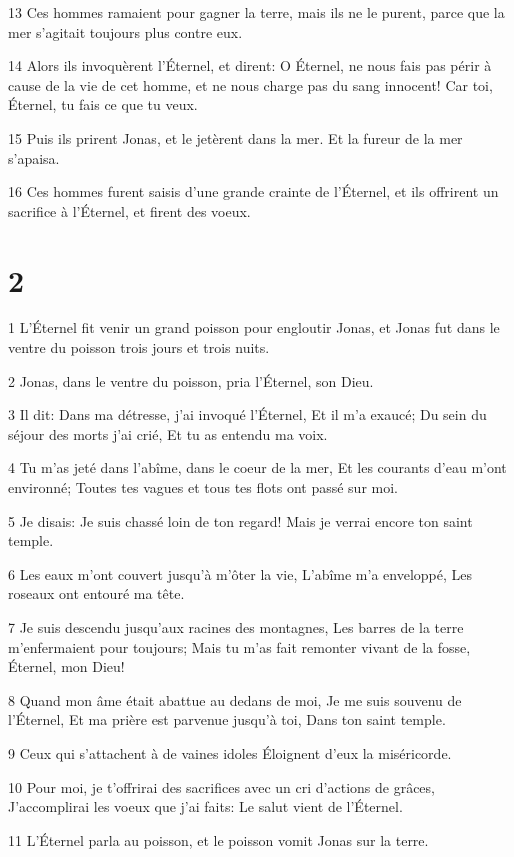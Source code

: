 \par 13 Ces hommes ramaient pour gagner la terre, mais ils ne le purent, parce que la mer s'agitait toujours plus contre eux.
\par 14 Alors ils invoquèrent l'Éternel, et dirent: O Éternel, ne nous fais pas périr à cause de la vie de cet homme, et ne nous charge pas du sang innocent! Car toi, Éternel, tu fais ce que tu veux.
\par 15 Puis ils prirent Jonas, et le jetèrent dans la mer. Et la fureur de la mer s'apaisa.
\par 16 Ces hommes furent saisis d'une grande crainte de l'Éternel, et ils offrirent un sacrifice à l'Éternel, et firent des voeux.

\chapter{2}

\par 1 L'Éternel fit venir un grand poisson pour engloutir Jonas, et Jonas fut dans le ventre du poisson trois jours et trois nuits.
\par 2 Jonas, dans le ventre du poisson, pria l'Éternel, son Dieu.
\par 3 Il dit: Dans ma détresse, j'ai invoqué l'Éternel, Et il m'a exaucé; Du sein du séjour des morts j'ai crié, Et tu as entendu ma voix.
\par 4 Tu m'as jeté dans l'abîme, dans le coeur de la mer, Et les courants d'eau m'ont environné; Toutes tes vagues et tous tes flots ont passé sur moi.
\par 5 Je disais: Je suis chassé loin de ton regard! Mais je verrai encore ton saint temple.
\par 6 Les eaux m'ont couvert jusqu'à m'ôter la vie, L'abîme m'a enveloppé, Les roseaux ont entouré ma tête.
\par 7 Je suis descendu jusqu'aux racines des montagnes, Les barres de la terre m'enfermaient pour toujours; Mais tu m'as fait remonter vivant de la fosse, Éternel, mon Dieu!
\par 8 Quand mon âme était abattue au dedans de moi, Je me suis souvenu de l'Éternel, Et ma prière est parvenue jusqu'à toi, Dans ton saint temple.
\par 9 Ceux qui s'attachent à de vaines idoles Éloignent d'eux la miséricorde.
\par 10 Pour moi, je t'offrirai des sacrifices avec un cri d'actions de grâces, J'accomplirai les voeux que j'ai faits: Le salut vient de l'Éternel.
\par 11 L'Éternel parla au poisson, et le poisson vomit Jonas sur la terre.

